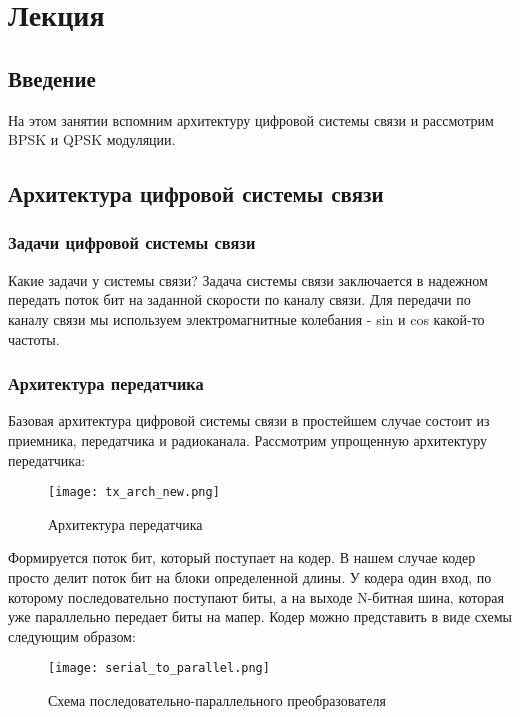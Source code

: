 \chapter{Лекция}
\label{ch:intro}

\section*{\textbf{Введение}}

На этом занятии вспомним архитектуру цифровой системы связи и рассмотрим BPSK и QPSK модуляции.

\section*{\textbf{Архитектура цифровой системы связи}}

\subsection*{\textbf{Задачи цифровой системы связи}}


Какие задачи у системы связи? Задача системы связи заключается в надежном передать поток бит на заданной скорости по каналу связи. Для передачи по каналу связи мы используем
электромагнитные колебания - sin и cos какой-то частоты.

\subsection*{\textbf{Архитектура передатчика}}


Базовая архитектура цифровой системы связи в простейшем случае состоит из приемника, передатчика и радиоканала. Рассмотрим
упрощенную архитектуру передатчика:

\begin{figure}[H]
    \centering
    \texttt{[image: tx\_arch\_new.png]}
    \caption{Архитектура передатчика}
\end{figure}

Формируется поток бит, который поступает на кодер. В нашем случае кодер просто делит поток бит на блоки определенной длины. У кодера
один вход, по которому последовательно поступают биты, а на выходе N-битная шина, которая уже параллельно передает биты на мапер.
Кодер можно представить в виде схемы следующим образом:

\begin{figure}[H]
    \centering
    \texttt{[image: serial\_to\_parallel.png]}
    \caption{Схема последовательно-параллельного преобразователя}
\end{figure}

